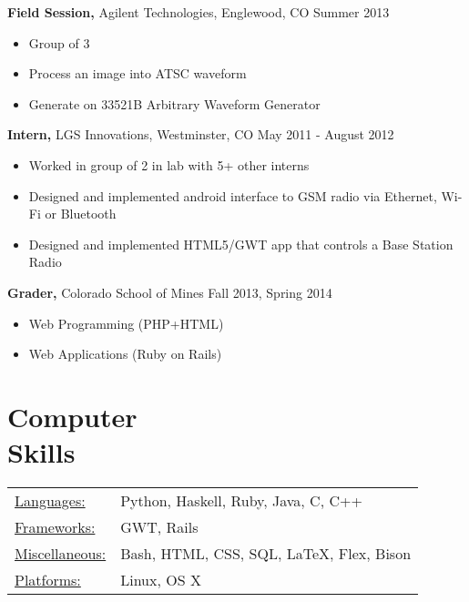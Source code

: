 \documentclass[margin]{res}
\begin{document}
\begin{resume}
 {\bf Field Session,} Agilent Technologies, Englewood, CO \hfill Summer 2013
 \begin{itemize} \itemsep -2pt
     \item Group of 3
     \item Process an image into ATSC waveform
     \item Generate on 33521B Arbitrary Waveform Generator
 \end{itemize}

 {\bf Intern,} LGS Innovations, Westminster, CO \hfill May 2011 - August 2012
 \begin{itemize} \itemsep -2pt
     \item Worked in group of 2 in lab with 5+ other interns
     \item Designed and implemented android interface to GSM radio via Ethernet, Wi-Fi or Bluetooth
     \item Designed and implemented HTML5/GWT app that controls a Base Station Radio
 \end{itemize}

 {\bf Grader,} Colorado School of Mines \hfill Fall 2013, Spring 2014
 \begin{itemize} \itemsep -2pt
    \item Web Programming (PHP+HTML)
    \item Web Applications (Ruby on Rails)
 \end{itemize}

\section{Computer \\ Skills}
\begin{tabular}{l p{3in}}
    \underline{Languages:} & Python, Haskell, Ruby, Java, C, C++ \\
    \underline{Frameworks:} & GWT, Rails \\
    \underline{Miscellaneous:} & Bash, HTML, CSS, SQL, \LaTeX, Flex, Bison \\
    \underline{Platforms:} & Linux, OS X
 \end{tabular}

\end{resume}
\end{document}
